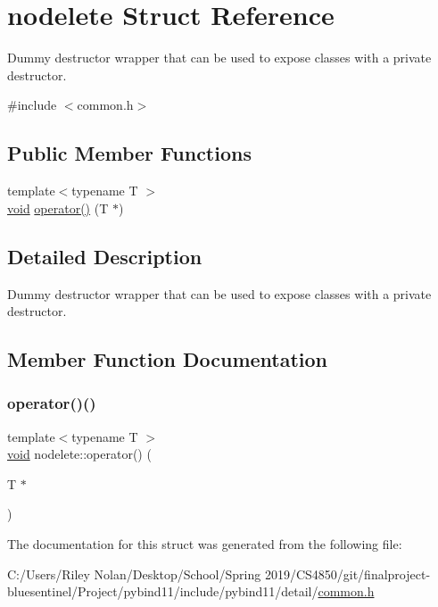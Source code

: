 \hypertarget{structnodelete}{}\section{nodelete Struct Reference}
\label{structnodelete}


Dummy destructor wrapper that can be used to expose classes with a private destructor.  




{\ttfamily \#include $<$common.\+h$>$}

\subsection*{Public Member Functions}
\begin{DoxyCompactItemize}
\item 
{\footnotesize template$<$typename T $>$ }\\\mbox{\hyperlink{_s_d_l__opengles2__gl2ext_8h_ae5d8fa23ad07c48bb609509eae494c95}{void}} \mbox{\hyperlink{structnodelete_a5f0dacc05c69366422b90b61fd47b6a5}{operator()}} (T $\ast$)
\end{DoxyCompactItemize}


\subsection{Detailed Description}
Dummy destructor wrapper that can be used to expose classes with a private destructor. 

\subsection{Member Function Documentation}
\mbox{\label{structnodelete_a5f0dacc05c69366422b90b61fd47b6a5}} 
\subsubsection{\texorpdfstring{operator()()}{operator()()}}
{\footnotesize\ttfamily template$<$typename T $>$ \\
\mbox{\hyperlink{_s_d_l__opengles2__gl2ext_8h_ae5d8fa23ad07c48bb609509eae494c95}{void}} nodelete\+::operator() (\begin{DoxyParamCaption}\item[{T $\ast$}]{ }\end{DoxyParamCaption})\hspace{0.3cm}{\ttfamily [inline]}}



The documentation for this struct was generated from the following file\+:\begin{DoxyCompactItemize}
\item 
C\+:/\+Users/\+Riley Nolan/\+Desktop/\+School/\+Spring 2019/\+C\+S4850/git/finalproject-\/bluesentinel/\+Project/pybind11/include/pybind11/detail/\mbox{\hyperlink{detail_2common_8h}{common.\+h}}\end{DoxyCompactItemize}
